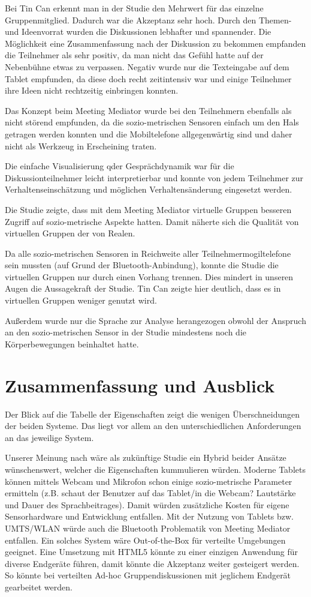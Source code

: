 \documentclass{seminarvorlage}
\begin{document}
Bei Tin Can erkennt man in der Studie den Mehrwert für das einzelne
Gruppenmitglied. Dadurch war die Akzeptanz sehr hoch. Durch den Themen- und
Ideenvorrat wurden die Diskussionen lebhafter und spannender. Die
Mög\-lich\-keit eine Zusammenfassung nach der Diskussion zu bekommen empfanden
die Teilnehmer als sehr positiv, da man nicht das Gefühl hatte auf der
Nebenbühne etwas zu verpassen. Negativ wurde nur die Texteingabe auf dem Tablet
empfunden, da diese doch recht zeitintensiv war und einige Teilnehmer ihre Ideen
nicht rechtzeitig einbringen konnten.

Das Konzept beim Meeting Mediator wurde bei den Teilnehmern ebenfalls als nicht
störend empfunden, da die sozio-metrischen Sensoren einfach um den Hals getragen
werden konnten und die Mobiltelefone allgegenwärtig sind und daher nicht als
Werkzeug in Erscheining traten.

Die einfache Visualisierung qder Gesprächdynamik war für die
Diskussionteilnehmer leicht interpretierbar und konnte von jedem Teilnehmer zur
Verhaltenseinschätzung und möglichen Verhaltensänderung eingesetzt werden.

Die Studie zeigte, dass mit dem Meeting Mediator virtuelle Gruppen besseren
Zugriff auf sozio-metrische Aspekte hatten. Damit näherte sich  die Qualität von
virtuellen Gruppen der von Realen.

Da alle sozio-metrischen Sensoren in Reichweite aller Teilnehmermogiltelefone
sein mussten (auf Grund der Bluetooth-Anbindung), konnte die Studie die
virtuellen Gruppen nur durch einen Vorhang trennen. Dies mindert in unseren
Augen die Aussagekraft der Studie.
Tin Can zeigte hier deutlich, dass es in virtuellen Gruppen weniger genutzt
wird.

Außerdem wurde nur die Sprache zur Analyse herangezogen obwohl der Anspruch an
den sozio-metrischen Sensor in der Studie mindestens noch die Körperbewegungen
beinhaltet hatte.

\section{Zusammenfassung und Ausblick}
Der Blick auf die Tabelle der Eigenschaften zeigt die
wenigen Überschneidungen der beiden Systeme. Das liegt vor allem an den
unterschiedlichen Anforderungen an das jeweilige System.

Unserer Meinung nach wäre als zukünftige Studie ein Hybrid beider Ansätze
wünschenswert, welcher die Eigenschaften kummulieren würden. Moderne Tablets
können mittels Webcam und Mikrofon schon einige sozio-metrische Parameter
ermitteln (z.B. schaut der Benutzer auf das Tablet/in die Webcam? Lautstärke und
Dauer des Sprachbeitrages). Damit würden zusätzliche Kosten für eigene
Sensorhardware und Entwicklung entfallen. Mit der Nutzung von Tablets bzw.
UMTS/WLAN würde auch die Bluetooth Problematik von Meeting Mediator entfallen.
Ein solches System wäre Out-of-the-Box für verteilte Umgebungen geeignet. Eine
Umsetzung mit HTML5 könnte zu einer einzigen Anwendung für diverse Endgeräte
führen, damit könnte die Akzeptanz weiter gesteigert werden. So könnte bei
verteilten Ad-hoc Gruppendiskussionen mit jeglichem Endgerät gearbeitet werden.
\end{document}
